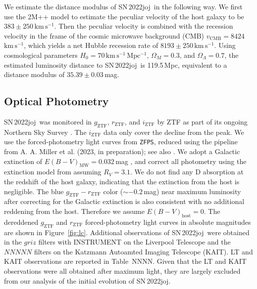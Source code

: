 \documentclass[twocolumn]{aastex631}
\newcommand{\sn}{SN\,2022joj}
\newcommand{\kms}{$\mathrm{km}\,\mathrm{s}^{-1}$}
\begin{document}
\begin{CJK*}{UTF8}{gbsn}
We estimate the distance modulus of \sn\ in the following way. We first use the 2M++ model \citep{Carrick2015_2M++} to estimate the peculiar velocity of the host galaxy to be $383\pm250$\,\kms. Then the peculiar velocity is combined with the recession velocity in the frame of the cosmic microwave background (CMB) $v_\mathrm{CMB}=8424$\,\kms, which yields a net Hubble recession rate of $8193\pm250$\,\kms. Using cosmological parameters $H_0 = 70\,\mathrm{km\,s^{-1}\,Mpc^{-1}}$, $\Omega_M=0.3$, and $\Omega_\Lambda=0.7$, the estimated luminosity distance to \sn\ is 119.5\,Mpc, equivalent to a distance modulus of $35.39\pm0.03$\,mag.

\subsection{Optical Photometry}
\sn\ was monitored in $g_\mathrm{ZTF}$, $r_\mathrm{ZTF}$, and $i_\mathrm{ZTF}$ by ZTF as part of its ongoing Northern Sky Survey \citep{Bellm_ZTF_2019b}. The $i_\mathrm{ZTF}$ data only cover the decline from the peak. We use the forced-photometry light curves from \texttt{ZFPS}, reduced using the pipeline from A. A. Miller et al. (2023, in preparation); see also \citet{Yao_2019}. We adopt a Galactic extinction of ${E(B-V)_\mathrm{MW}}=0.032$\,mag \citep{Schlafly2011}, and correct all photometry using the extinction model from \citet{Fitzpatrick1999} assuming $R_V=3.1$. We do not find any  D absorption at the redshift of the host galaxy, indicating that the extinction from the host is negligible. The blue $g_\mathrm{ZTF}-r_\mathrm{ZTF}$ color ($\sim$$-0.2$\,mag) near maximum luminosity after correcting for the Galactic extinction is also consistent with no additional reddening from the host. Therefore we assume ${E(B-V)}_\mathrm{host}=0$. The dereddened $g_\mathrm{ZTF}$ and $r_\mathrm{ZTF}$ forced-photometry light curves in absolute magnitudes are shown in Figure~\ref{fig:lc}. 
    Additional observations of \sn\ were obtained in the $griz$ filters with INSTRUMENT on the Liverpool Telescope and the $NNNNN$ filters on the Katzmann Autoamted Imaging Telescope (KAIT). LT and KAIT observations are reported in Table~NNNN. Given that the LT and KAIT observations were all obtained after maximum light, they are largely excluded from our analysis of the initial evolution of \sn.


\end{CJK*}
\end{document}
